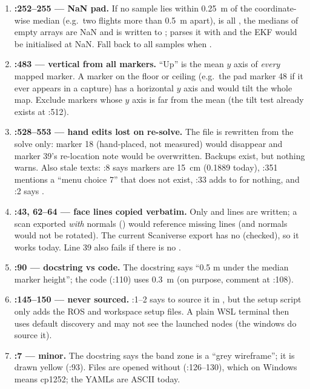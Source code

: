 \begin{review}
\begin{enumerate}[leftmargin=*]
  ; the code defaults are 1.4 2.4 and 0.35 (and the band file uses 1.7 2.0, 0.25).
  Also :146 draws a caption wider than the image: it is cut in .
\item \textbf{:252--255 --- NaN pad.} If no sample lies within 0.25~m of the
  coordinate-wise median (e.g.\ two flights more than 0.5~m apart),  is all , the medians of
  empty arrays are NaN and  is written to ;   parses it
  with  and the EKF would be initialised at NaN. Fall back to all samples when .
\item \textbf{:483 --- vertical from all markers.} ``Up'' is the mean $y$ axis of
  \emph{every} mapped marker. A marker on the floor or ceiling (e.g.\ the pad marker 48 if it ever appears in a
  capture) has a horizontal $y$ axis and would tilt the whole map. Exclude markers whose $y$ axis is far from the
  mean (the tilt test already exists at :512).
\item \textbf{:528--553 --- hand edits lost on re-solve.} The file is rewritten from the
  solve only: marker 18 (hand-placed, not measured) would disappear and marker 39's re-location note would be
  overwritten. Backups exist, but nothing warns. Also stale texts: :8 says markers are 15~cm (0.1889 today),
  :351 mentions a ``menu choice 7'' that does not exist, :33 adds  to  for nothing,
  and :2 says .
\item \textbf{:43, 62--64 --- face lines copied verbatim.} Only  and
   lines are written; a scan exported \emph{with} normals () would reference missing
   lines (and normals would not be rotated). The current Scaniverse export has no  (checked), so it
  works today. Line 39 also fails if there is no .
\item \textbf{:90 --- docstring vs code.} The docstring says ``0.5 m
  under the median marker height''; the code (:110) uses 0.3~m (on purpose, comment at :108).
\item \textbf{:145--150 ---  never sourced.}
  :1--2 says to source it in , but the setup script only adds the ROS
  and workspace setup files. A plain WSL terminal then uses default discovery and may not see the launched nodes
  (the  windows do source it).
\item \textbf{:7 --- minor.} The docstring says the band zone is a ``grey wireframe''; it
  is drawn yellow (:93). Files are opened without  (:126--130), which on Windows means cp1252; the
  YAMLs are ASCII today.
\end{enumerate}
\end{review}
\fussy
